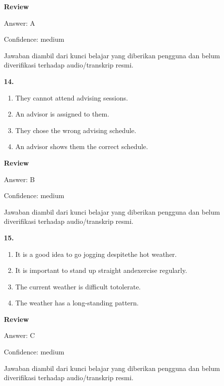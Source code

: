 \documentclass[12pt]{article}
\begin{document}
\par
\begingroup
\setlength{\parskip}{0pt}
\setlength{\parindent}{0pt}
\textbf{Review}\par
Answer: A\par
Confidence: medium\par
Jawaban diambil dari kunci belajar yang diberikan pengguna dan belum diverifikasi terhadap audio/transkrip resmi.\par
\endgroup
\par
\vspace{0.25\baselineskip}
\noindent\textbf{14.}
\begin{enumerate}[label=(\Alph*),leftmargin=*,itemsep=0.2em]
\item They cannot attend advising sessions.
\item An advisor is assigned to them.
\item They chose the wrong advising schedule.
\item An advisor shows them the correct schedule.
\end{enumerate}
\par
\begingroup
\setlength{\parskip}{0pt}
\setlength{\parindent}{0pt}
\textbf{Review}\par
Answer: B\par
Confidence: medium\par
Jawaban diambil dari kunci belajar yang diberikan pengguna dan belum diverifikasi terhadap audio/transkrip resmi.\par
\endgroup
\par
\vspace{0.25\baselineskip}
\noindent\textbf{15.}
\begin{enumerate}[label=(\Alph*),leftmargin=*,itemsep=0.2em]
\item It is a good idea to go jogging despitethe hot weather.
\item It is important to stand up straight andexercise regularly.
\item The current weather is difficult totolerate.
\item The weather has a long-standing pattern.
\end{enumerate}
\par
\begingroup
\setlength{\parskip}{0pt}
\setlength{\parindent}{0pt}
\textbf{Review}\par
Answer: C\par
Confidence: medium\par
Jawaban diambil dari kunci belajar yang diberikan pengguna dan belum diverifikasi terhadap audio/transkrip resmi.\par
\end{document}
